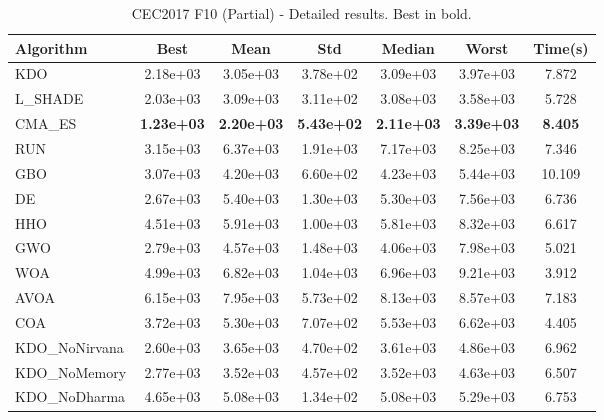 \begin{table}[H]
\centering\small
\caption{CEC2017 F10 (Partial) - Detailed results. Best in bold.}
\label{tab:cec2017_F10}
\begin{tabular}{lcccccc}
\toprule
\textbf{Algorithm} & \textbf{Best} & \textbf{Mean} & \textbf{Std} & \textbf{Median} & \textbf{Worst} & \textbf{Time(s)} \\
\midrule
KDO & 2.18e+03 & 3.05e+03 & 3.78e+02 & 3.09e+03 & 3.97e+03 & 7.872 \\
L_SHADE & 2.03e+03 & 3.09e+03 & 3.11e+02 & 3.08e+03 & 3.58e+03 & 5.728 \\
CMA_ES & \textbf{1.23e+03} & \textbf{2.20e+03} & \textbf{5.43e+02} & \textbf{2.11e+03} & \textbf{3.39e+03} & \textbf{8.405} \\
RUN & 3.15e+03 & 6.37e+03 & 1.91e+03 & 7.17e+03 & 8.25e+03 & 7.346 \\
GBO & 3.07e+03 & 4.20e+03 & 6.60e+02 & 4.23e+03 & 5.44e+03 & 10.109 \\
DE & 2.67e+03 & 5.40e+03 & 1.30e+03 & 5.30e+03 & 7.56e+03 & 6.736 \\
HHO & 4.51e+03 & 5.91e+03 & 1.00e+03 & 5.81e+03 & 8.32e+03 & 6.617 \\
GWO & 2.79e+03 & 4.57e+03 & 1.48e+03 & 4.06e+03 & 7.98e+03 & 5.021 \\
WOA & 4.99e+03 & 6.82e+03 & 1.04e+03 & 6.96e+03 & 9.21e+03 & 3.912 \\
AVOA & 6.15e+03 & 7.95e+03 & 5.73e+02 & 8.13e+03 & 8.57e+03 & 7.183 \\
COA & 3.72e+03 & 5.30e+03 & 7.07e+02 & 5.53e+03 & 6.62e+03 & 4.405 \\
KDO_NoNirvana & 2.60e+03 & 3.65e+03 & 4.70e+02 & 3.61e+03 & 4.86e+03 & 6.962 \\
KDO_NoMemory & 2.77e+03 & 3.52e+03 & 4.57e+02 & 3.52e+03 & 4.63e+03 & 6.507 \\
KDO_NoDharma & 4.65e+03 & 5.08e+03 & 1.34e+02 & 5.08e+03 & 5.29e+03 & 6.753 \\
\bottomrule
\end{tabular}
\end{table}

